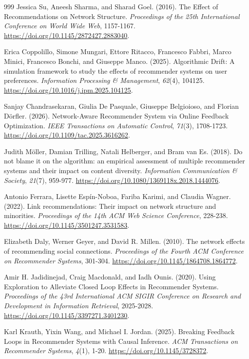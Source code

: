 \documentclass[10pt,a4paper]{article}
\begin{document}
\begin{thebibliography}{999}
Jessica Su, Aneesh Sharma, and Sharad Goel. (2016). The Effect of Recommendations on Network Structure. \textit{Proceedings of the 25th International Conference on World Wide Web}, 1157-1167. \url{https://doi.org/10.1145/2872427.2883040}.

Erica Coppolillo, Simone Mungari, Ettore Ritacco, Francesco Fabbri, Marco Minici, Francesco Bonchi, and Giuseppe Manco. (2025). Algorithmic Drift: A simulation framework to study the effects of recommender systems on user preferences. \textit{Information Processing \& Management}, \textit{62}(4), 104125. \url{https://doi.org/10.1016/j.ipm.2025.104125}.

Sanjay Chandrasekaran, Giulia De Pasquale, Giuseppe Belgioioso, and Florian D\"{o}rfler. (2026). Network-Aware Recommender System via Online Feedback Optimization. \textit{IEEE Transactions on Automatic Control}, \textit{71}(3), 1708-1723. \url{https://doi.org/10.1109/tac.2025.3616262}.

Judith M\"{o}ller, Damian Trilling, Natali Helberger, and Bram van Es. (2018). Do not blame it on the algorithm: an empirical assessment of multiple recommender systems and their impact on content diversity. \textit{Information Communication \& Society}, \textit{21}(7), 959-977. \url{https://doi.org/10.1080/1369118x.2018.1444076}.

Antonio Ferrara, Lisette Esp\'{i}n-Noboa, Fariba Karimi, and Claudia Wagner. (2022). Link recommendations: Their impact on network structure and minorities. \textit{Proceedings of the 14th ACM Web Science Conference}, 228-238. \url{https://doi.org/10.1145/3501247.3531583}.

Elizabeth Daly, Werner Geyer, and David R. Millen. (2010). The network effects of recommending social connections. \textit{Proceedings of the Fourth ACM Conference on Recommender Systems}, 301-304. \url{https://doi.org/10.1145/1864708.1864772}.

Amir H. Jadidinejad, Craig Macdonald, and Iadh Ounis. (2020). Using Exploration to Alleviate Closed Loop Effects in Recommender Systems. \textit{Proceedings of the 43rd International ACM SIGIR Conference on Research and Development in Information Retrieval}, 2025-2028. \url{https://doi.org/10.1145/3397271.3401230}.

Karl Krauth, Yixin Wang, and Michael I. Jordan. (2025). Breaking Feedback Loops in Recommender Systems with Causal Inference. \textit{ACM Transactions on Recommender Systems}, \textit{4}(1), 1-20. \url{https://doi.org/10.1145/3728372}.


\end{thebibliography}
\end{document}

